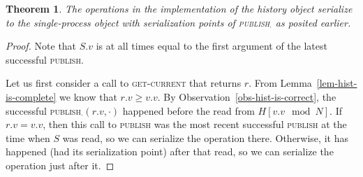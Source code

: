\documentclass{thesis}
\newtheorem{theorem}{Theorem}
\newcommand{\fn}[1]{\textsc{#1}}
\begin{document}
\begin{theorem}
The operations in the implementation of the history object serialize to the single-process object with serialization points of \fn{publish$_\cdot$} as posited earlier.
\end{theorem}
\begin{proof}
Note that $S.v$ is at all times equal to the first argument of the latest successful \fn{publish}.

Let us first consider a call to \fn{get-current} that returns $r$. From Lemma~\ref{lem-hist-is-complete} we know that $r.v \geq v.v$.
By Observation~\ref{obs-hist-is-correct}, the successful \fn{publish$_\cdot$}$(r.v, \cdot)$ happened before the read from $H[v.v\mod N]$. If $r.v = v.v$, then this call to \fn{publish} was the most recent successful \fn{publish} at the time when $S$ was read, so we can serialize the operation there. Otherwise, it has happened (had its serialization point) after that read, so we can serialize the operation just after it.


\end{proof}
\end{document}
